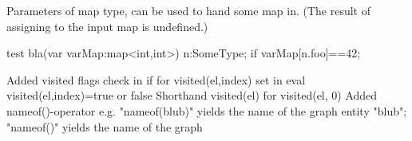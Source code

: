 Parameters of map type, can be used to hand some map in.
(The result of assigning to the input map is undefined.)
\begin{grgen}
test bla(var varMap:map<int,int>) 
{
	n:SomeType;
	if {  varMap[n.foo]==42; }
}
\end{grgen}

Added visited flags
check in if for visited(el,index)
set in eval visited(el,index)=true or false
Shorthand visited(el) for visited(el, 0)
Added nameof()-operator
e.g. "nameof(blub)" yields the name of the graph entity "blub";
"nameof()" yields the name of the graph
